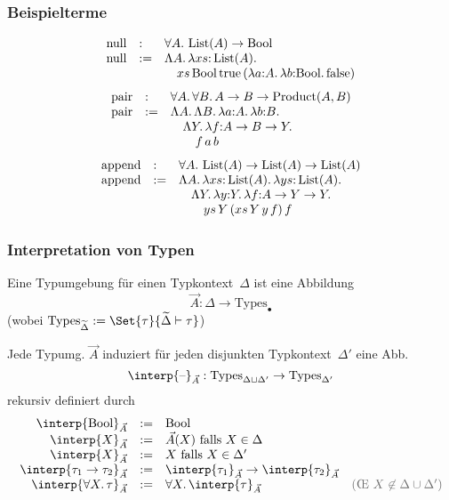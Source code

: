 \documentclass{beamer}
\newcommand{\defeq}{:=} %
\newcommand{\Bool}{\text{Bool}}
\newcommand{\trueV}{\text{true}}
\newcommand{\falseV}{\text{false}}
\newcommand{\fa}[1]{\forall {#1}.\,}
\newcommand{\lam}[1]{\lambda #1.\,}
\newcommand{\Lam}[1]{\Lambda #1.\,}
\newcommand{\Types}{\text{Types}}
\newcommand{\emptyCtx}{\bullet}
\newcommand{\blank}{\text{--}} %
\newcommand{\typeInterp}[2]{\interp{#2}_{#1}}
\DeclareMathOperator{\Product}{Product}
\DeclareMathOperator{\List}{List}
\renewcommand{\emph}[1]{\textcolor{Emph}{#1}}
\newcommand{\info}[1]{\textcolor{dimgray}{#1}}
\begin{document}
\begin{frame}
  \frametitle{Beispielterme}
  \[\begin{array}{r l l}
    \text{null} &:& \fa{A} \List(A) \to \Bool \\
    \text{null} &\defeq& \Lam{A} \lam{xs{:}\List(A)} \\
    && \quad xs\,\Bool\,\trueV\,(\lam{a{:}A} \lam{b{:}\Bool} \falseV)
  \end{array}\]
  \[\begin{array}{r l l}
    \text{pair} &:& \fa{A} \fa{B} A \to B \to \Product(A, B) \\
    \text{pair} &\defeq& \Lam{A} \Lam{B} \lam{a{:}A} \lam{b{:}B} \\
    && \quad \Lam{Y} \lam{f{:}A \to B \to Y} \\
    && \quad\quad f\,a\,b
  \end{array}\]
  \[\begin{array}{r l l}
    \text{append} &:& \fa{A} \List(A) \to \List(A) \to \List(A) \\
    \text{append} &\defeq& \Lam{A} \lam{xs{:}\List(A)} \lam{ys{:}\List(A)} \\
    && \quad \Lam{Y} \lam{y{:}Y} \lam{f{:}A \to Y \to Y} \\
    && \quad\quad ys\,Y\,(xs\,Y\,y\,f)\,f
  \end{array}\]
\end{frame}

\begin{frame}
  \frametitle{Interpretation von Typen}

  Eine \emph{Typumgebung} für einen Typkontext~$\Delta$ ist eine Abbildung
  \[ \vec{A} : \Delta \to \Types_\emptyCtx \]
  (wobei $\Types_{\widetilde{\Delta}} \defeq \Set{\tau}{\widetilde{\Delta} \vdash \tau}$)

  Jede Typumg. $\vec{A}$ induziert für jeden disjunkten Typkontext~$\Delta'$ eine Abb.
  \[ \typeInterp{\vec{A}}{\blank} : \Types_{\Delta \sqcup \Delta'} \to \Types_{\Delta'} \]
  rekursiv definiert durch
  \[
    \begin{array}{r c l l}
      \typeInterp{\vec{A}}{\Bool} &\defeq& \Bool \\
      \typeInterp{\vec{A}}{X} &\defeq& \vec{A}(X) \text{ falls $X \in \Delta$} \\
      \typeInterp{\vec{A}}{X} &\defeq& X \text{ falls $X \in \Delta'$} \\
      \typeInterp{\vec{A}}{\tau_1 \to \tau_2} &\defeq& \typeInterp{\vec{A}}{\tau_1} \to \typeInterp{\vec{A}}{\tau_2} \\
      \typeInterp{\vec{A}}{\fa{X} \tau} &\defeq& \fa{X} \typeInterp{\vec{A}}{\tau} & \text{\info{(\OE{} $X \not\in \Delta \cup \Delta'$)}} \\
    \end{array}
  \]
\end{frame}
\end{document}
